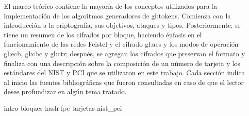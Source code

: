 %
%

%
%
El marco teórico contiene la mayoría de los conceptos utilizados para la
implementación de los algoritmos generadores de \glspl{gl:token}. Comienza con
la introducción a la criptografía, sus objetivos, ataques y tipos.
Posteriormente, se tiene un resumen de los cifrados por bloque, haciendo énfasis
en el funcionamiento de las redes Feistel y el cifrado \gls{gl:aes} y los modos
de operación \gls{gl:ecb}, \gls{gl:cbc} y \gls{gl:ctr}; después, se agregan los
cifrados que preservan el formato y finaliza con una descripción sobre la
composición de un número de tarjeta y los estándares del NIST y PCI que se
utilizaron en este trabajo. Cada sección indica al inicio las fuentes
bibliográficas que fueron consultadas en caso de que el lector desee
profundizar en algún tema tratado.

{intro}
{bloques}
{hash}
{fpe}
{tarjetas}
{nist_pci}
